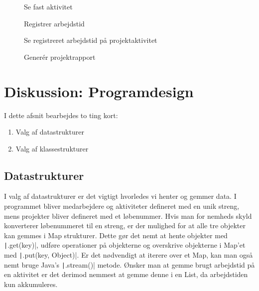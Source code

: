 \begin{figure}[H]
    \centering
    \caption{Se fast aktivitet}\label{fig:sequenceViewRegularActivity}
\end{figure}
\begin{figure}[H]
    \centering
    \caption{Registrer arbejdstid}\label{fig:sequenceRegisterWorktime}
\end{figure}
\begin{figure}[H]
    \centering
    \caption{Se registreret arbejdstid på projektaktivitet}\label{fig:sequenceViewWorktime}
\end{figure}
\begin{figure}[H]
    \centering
    \caption{Generér projektrapport}\label{fig:sequenceGenerateProjectReport}
\end{figure}
\newpage
\section{Diskussion: Programdesign}
I dette afsnit bearbejdes to ting kort:
\begin{enumerate}
    \item Valg af datastrukturer
    \item Valg af klassestrukturer
\end{enumerate}
\subsection{Datastrukturer} I valg af datastrukturer er det vigtigt hvorledes vi henter og gemmer data. I programmet bliver medarbejdere og aktiviteter defineret med en unik streng, mens projekter bliver defineret med et løbenummer. Hvis man for nemheds skyld konverterer løbenummeret til en streng, er der mulighed for at alle tre objekter kan gemmes i Map strukturer. Dette gør det nemt at hente objekter med \texttt|.get(key)|, udføre operationer på objekterne og overskrive objekterne i Map'et med \texttt|.put(key, Object)|. Er det nødvendigt at iterere over et Map, kan man også nemt bruge Java's \texttt|.stream()| metode. Ønsker man at gemme brugt arbejdstid på en aktivitet er det derimod nemmest at gemme denne i en List, da arbejdstiden kun akkumuleres.
